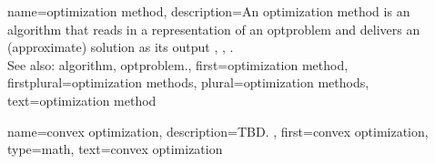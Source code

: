{name={optimization method},
	description={An optimization method is an \gls{algorithm} that 
		reads in a representation of an \gls{optproblem} and delivers an (approximate) solution 
		as its output \cite{BoydConvexBook}, \cite{BertsekasNonLinProgr}, \cite{nesterov04}.
		 \\
		 See also: \gls{algorithm}, \gls{optproblem}.},
	first={optimization method},
	firstplural={optimization methods}, 
	plural={optimization methods}, 
	text={optimization method}
}

{name={convex optimization},
 	description={TBD. 
  },
	first={convex optimization},
	type=math,
  	text={convex optimization}
}


